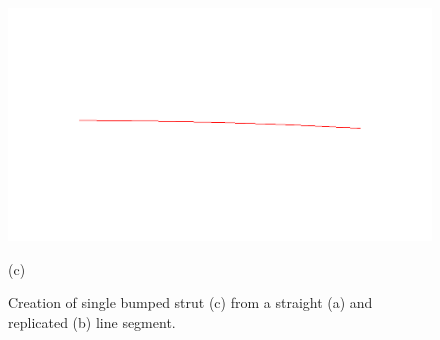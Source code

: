\begin{figure} [ht]
\begin{latexonly}
\begin{minipage} [c] [] [c] {3.5cm}
\end{minipage}
\hspace{0.3cm}
\begin{minipage} [c] [] [c] {3.5cm}
	\includegraphics [width =\textwidth] {images/WireStentDemot2Step03}
	\begin{center}
	\vspace{-3ex}
	(c)
	\vspace{1ex}
	\end{center}
\end{minipage}
\hspace{0.3cm}	
   \end{latexonly}
   \begin{htmlonly}
   \end{htmlonly}

	\caption {Creation of single bumped strut (c) from a straight (a) and replicated (b) line segment.} 
	\label{bumped}	
\end{figure}

